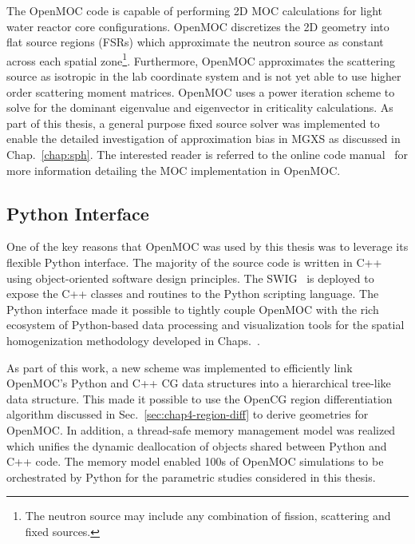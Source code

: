 The OpenMOC code is capable of performing 2D \ac{MOC} calculations for light water reactor core configurations. OpenMOC discretizes the 2D geometry into flat source regions (FSRs) which approximate the neutron source as constant across each spatial zone\footnote{The neutron source may include any combination of fission, scattering and fixed sources.}. Furthermore, OpenMOC approximates the scattering source as isotropic in the lab coordinate system and is not yet able to use higher order scattering moment matrices. OpenMOC uses a power iteration scheme to solve for the dominant eigenvalue and eigenvector in criticality calculations. As part of this thesis, a general purpose fixed source solver was implemented to enable the detailed investigation of approximation bias in \ac{MGXS} as discussed in Chap.~\ref{chap:sph}. The interested reader is referred to the online code manual~\cite{openmoc2016manual} for more information detailing the \ac{MOC} implementation in OpenMOC.

\subsection{Python Interface}
\label{subsubsec:chap4-openmoc-python}

One of the key reasons that OpenMOC was used by this thesis was to leverage its flexible Python interface. The majority of the source code is written in C++ using object-oriented software design principles. The \ac{SWIG}~\cite{beazley2003swig} is deployed to expose the C++ classes and routines to the Python scripting language. The Python interface made it possible to tightly couple OpenMOC with the rich ecosystem of Python-based data processing and visualization tools for the spatial homogenization methodology developed in Chaps.~.

As part of this work, a new scheme was implemented to efficiently link OpenMOC's Python and C++ \ac{CG} data structures into a hierarchical tree-like data structure. This made it possible to use the OpenCG region differentiation algorithm discussed in Sec.~\ref{sec:chap4-region-diff} to derive geometries for OpenMOC. In addition, a thread-safe memory management model was realized which unifies the dynamic deallocation of objects shared between Python and C++ code. The memory model enabled 100s of OpenMOC simulations to be orchestrated by Python for the parametric studies considered in this thesis.

